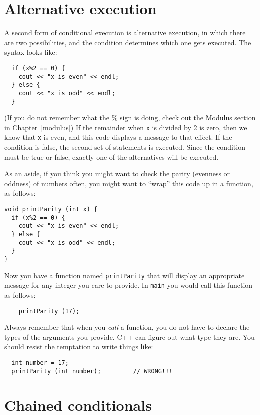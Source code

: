 \section {Alternative execution}
\label{alternative}

A second form of conditional execution is alternative execution,
in which there are two possibilities, and the condition determines
which one gets executed.  The syntax looks like:

\begin{verbatim}
  if (x%2 == 0) {
    cout << "x is even" << endl;
  } else {
    cout << "x is odd" << endl;
  }
\end{verbatim}
%
(If you do not remember what the \% sign is doing, check out the
Modulus section in Chapter~\ref{modulus})
If the remainder when {\tt x} is divided by 2 is zero, then
we know that {\tt x} is even, and this code displays a message
to that effect.  If the condition is false, the second
set of statements is executed.  Since the condition must
be true or false, exactly one of the alternatives will be
executed.

As an aside, if you think you might want to check the parity
(evenness or oddness) of numbers often, you might want to
``wrap'' this code up in a function, as follows:

\begin{verbatim}
void printParity (int x) {
  if (x%2 == 0) {
    cout << "x is even" << endl;
  } else {
    cout << "x is odd" << endl;
  }
}
\end{verbatim}
%
Now you have a function named {\tt printParity} that will display
an appropriate message for any integer you care to provide.
In {\tt main} you would call this function as follows:

\begin{verbatim}
    printParity (17);
\end{verbatim}
%
Always remember that when you {\em call} a function, you do
not have to declare the types of the arguments you provide.
C++ can figure out what type they are.  You should resist the
temptation to write things like:

\begin{verbatim}
  int number = 17;
  printParity (int number);         // WRONG!!!
\end{verbatim}

\section {Chained conditionals}

